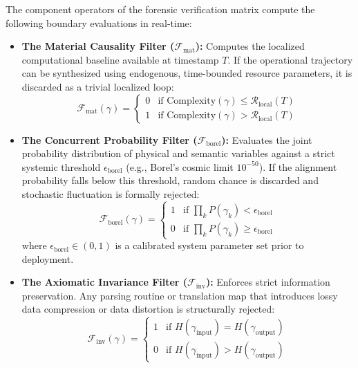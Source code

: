 \documentclass[11pt,a4paper]{article}
\begin{document}
The component operators of the forensic verification matrix compute the following boundary evaluations in real-time:
\begin{itemize}
    \item \textbf{The Material Causality Filter ($\mathcal{F}_{\text{mat}}$):} Computes the localized computational baseline available at timestamp $T$. If the operational trajectory can be synthesized using endogenous, time-bounded resource parameters, it is discarded as a trivial localized loop:
    \begin{equation}
        \mathcal{F}_{\text{mat}}(\gamma) = \begin{cases} 0 & \text{if } \text{Complexity}(\gamma) \le \mathcal{R}_{\text{local}}(T) \\ 1 & \text{if } \text{Complexity}(\gamma) > \mathcal{R}_{\text{local}}(T) \end{cases}
    \end{equation}
    \item \textbf{The Concurrent Probability Filter ($\mathcal{F}_{\text{borel}}$):} Evaluates the joint probability distribution of physical and semantic variables against a strict systemic threshold $\epsilon_{\text{borel}}$ (e.g., Borel's cosmic limit $10^{-50}$). If the alignment probability falls below this threshold, random chance is discarded and stochastic fluctuation is formally rejected:
    \begin{equation}
        \mathcal{F}_{\text{borel}}(\gamma) = \begin{cases} 1 & \text{if } \prod_{k} P(\gamma_k) < \epsilon_{\text{borel}} \\ 0 & \text{if } \prod_{k} P(\gamma_k) \ge \epsilon_{\text{borel}} \end{cases}
    \end{equation}
    where $\epsilon_{\text{borel}} \in (0, 1)$ is a calibrated system parameter set prior to deployment.
    \item \textbf{The Axiomatic Invariance Filter ($\mathcal{F}_{\text{inv}}$):} Enforces strict information preservation. Any parsing routine or translation map that introduces lossy data compression or data distortion is structurally rejected:
    \begin{equation}
        \mathcal{F}_{\text{inv}}(\gamma) = \begin{cases} 1 & \text{if } H(\gamma_{\text{input}}) = H(\gamma_{\text{output}}) \\ 0 & \text{if } H(\gamma_{\text{input}}) > H(\gamma_{\text{output}}) \end{cases}

\end{equation}
\end{itemize}
\end{document}
